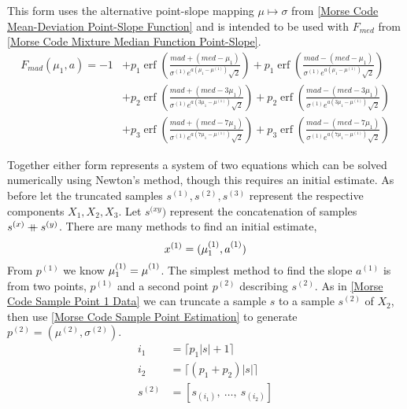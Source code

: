 \documentclass{article}
\newcommand{\mli}[1]{\mathit{#1}}
\newcommand\mdoubleplus{\ensuremath{\mathbin{+\mkern-10mu+}}}
\DeclareMathOperator\erf{erf}
\begin{document}
This form uses the alternative point-slope mapping $\mu \mapsto \sigma$ from \ref{Morse Code Mean-Deviation Point-Slope Function} and is intended to be used with $F_{\mli{med}}$ from \ref{Morse Code Mixture Median Function Point-Slope}.
%
\begin{equation}\label{Morse Code Mixture MAD Function Point-Slope}
\begin{split}
F_{\mli{mad}}(\mu_1, a) = -1
&   + p_1 \erf \left( \frac{\mli{mad} + (\mli{med} - \mu_1)}
        {\sigma^{(1)} e^{a (\mu_1 - \mu^{(1)})} \sqrt{2}}
        \right)
    + p_1 \erf \left( \frac{\mli{mad} - (\mli{med} - \mu_1)}
        {\sigma^{(1)} e^{a (\mu_1 - \mu^{(1)})} \sqrt{2}}
        \right) \\
&   + p_2 \erf \left( \frac{\mli{mad} + (\mli{med} - 3\mu_1)}
        {\sigma^{(1)} e^{a (3\mu_1 - \mu^{(1)})} \sqrt{2}}
        \right)
    + p_2 \erf \left( \frac{\mli{mad} - (\mli{med} - 3\mu_1)}
        {\sigma^{(1)} e^{a (3\mu_1 - \mu^{(1)})} \sqrt{2}}
        \right) \\
&   + p_3 \erf \left( \frac{\mli{mad} + (\mli{med} - 7\mu_1)}
        {\sigma^{(1)} e^{a (7\mu_1 - \mu^{(1)})} \sqrt{2}}
        \right)
    + p_3 \erf \left( \frac{\mli{mad} - (\mli{med} - 7\mu_1)}
        {\sigma^{(1)} e^{a (7\mu_1 - \mu^{(1)})} \sqrt{2}}
        \right)
\end{split}
\end{equation}

Together either form represents a system of two equations which can be solved numerically using Newton's method, though this requires an initial estimate. As before let the truncated samples $s^{(1)}, s^{(2)}, s^{(3)}$ represent the respective components $X_1, X_2, X_3$. Let $s^{(xy})$ represent the concatenation of samples $s^{(x)} \mdoubleplus s^{(y)}$. There are many methods to find an initial estimate,
%
\begin{equation}
x^{(1)} = (\mu^{(1)}_1, a^{(1)}_{\vphantom{1}})
\end{equation}
%
From $p^{(1)}$ we know $\mu^{(1)}_1 = \mu^{(1)}_{\vphantom{1}}$. The simplest method to find the slope $a^{(1)}$ is from two points, $p^{(1)}$ and a second point $p^{(2)}$ describing $s^{(2)}$. As in \ref{Morse Code Sample Point 1 Data} we can truncate a sample $s$ to a sample $s^{(2)}$ of $X_2$, then  use \ref{Morse Code Sample Point Estimation} to generate $p^{(2)} = (\mu^{(2)}, \sigma^{(2)})$.
%
\begin{equation}\label{Morse Code Sample Point 2 Data}
\begin{split}
i_1 &= \lceil p_1 |s| + 1\rceil \\
i_2 &= \lceil (p_1 + p_2) |s| \rceil \\
s^{(2)} &= \left[ s_{(i_1)},\ \ldots,\ s_{(i_2)} \right]
\end{split}
\end{equation}
\end{document}
